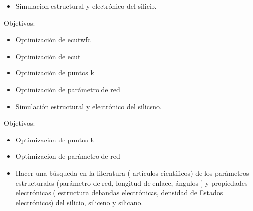 \begin{itemize}
    \item Simulacion estructural y electrónico del ​silicio​.
\end{itemize}

\vspace{0.5cm}

Objetivos:

\begin{itemize}
    \item Optimización de ecutwfc
    \item Optimización de ecut
    \item Optimización de puntos k
    \item Optimización de parámetro de red
\end{itemize}

\begin{itemize}
    \item Simulación estructural y electrónico del ​siliceno​.
\end{itemize}

\vspace{0.5cm}

Objetivos:

\begin{itemize}
    \item Optimización de puntos k
    \item Optimización de parámetro de red
\end{itemize}

\begin{itemize}
    \item Hacer una búsqueda en la literatura ( artículos científicos) de los parámetros estructurales 
    (parámetro de red, longitud de enlace, ángulos ) y propiedades electrónicas 
    ( estructura debandas electrónicas, densidad de Estados electrónicos) del silicio, siliceno y silicano.
\end{itemize}